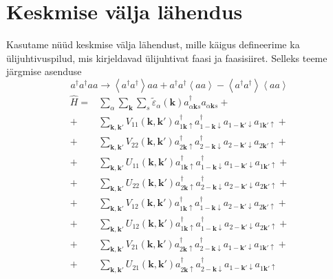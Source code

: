 \documentclass[class=article, crop=false]{standalone}
\begin{document}
\section{Keskmise välja lähendus}
Kasutame nüüd keskmise välja lähendust, mille käigus defineerime ka ülijuhtivuspilud, mis kirjeldavad ülijuhtivat faasi ja faasisiiret. Selleks teeme järgmise asenduse
\begin{equation}
a^{ \dagger}a^{ \dagger} a a \rightarrow \left\langle  a^{ \dagger} a^{ \dagger} \right\rangle a a + a^{ \dagger} a^{ \dagger} \left\langle a a \right\rangle - \left\langle a^{ \dagger} a^{ \dagger} \right\rangle \left\langle a a \right\rangle
\end{equation}
\begin{equation} \label{key}
	\begin{split}
		\hat{H} = & \sum_{ \alpha} \sum_{ \mathbf{k}} \sum_{s} \tilde{ \varepsilon}_{ \alpha} ( \mathbf{k}) a^{ \dagger}_{ \alpha \mathbf{k} s} a_{ \alpha \mathbf{k} s} + \\
		+ & \sum_{ \mathbf{k}, \mathbf{k}'} V_{ 1 1} ( \mathbf{k}, \mathbf{k}') a^{ \dagger}_{ 1 \mathbf{k} \uparrow} a^{ \dagger}_{ 1 -\mathbf{k} \downarrow} a_{ 1 -\mathbf{k}' \downarrow} a_{ 1 \mathbf{k}' \uparrow} + \\
		+ & \sum_{ \mathbf{k}, \mathbf{k}'} V_{ 2 2} ( \mathbf{k}, \mathbf{k}') a^{ \dagger}_{ 2 \mathbf{k} \uparrow} a^{ \dagger}_{ 2 -\mathbf{k} \downarrow} a_{ 2 -\mathbf{k}' \downarrow} a_{ 2 \mathbf{k}' \uparrow} + \\
		+ & \sum_{ \mathbf{k}, \mathbf{k}'} U_{ 1 1} ( \mathbf{k}, \mathbf{k}') a^{ \dagger}_{ 1 \mathbf{k} \uparrow} a^{ \dagger}_{ 1 -\mathbf{k} \downarrow} a_{ 1 -\mathbf{k}' \downarrow} a_{ 1 \mathbf{k}' \uparrow} + \\
		+ & \sum_{ \mathbf{k}, \mathbf{k}'} U_{ 2 2} ( \mathbf{k}, \mathbf{k}') a^{ \dagger}_{ 2 \mathbf{k} \uparrow} a^{ \dagger}_{ 2 -\mathbf{k} \downarrow} a_{ 2 -\mathbf{k}' \downarrow} a_{ 2 \mathbf{k}' \uparrow} + \\
		+ & \sum_{ \mathbf{k}, \mathbf{k}'} V_{ 1 2} ( \mathbf{k}, \mathbf{k}') a^{ \dagger}_{ 1 \mathbf{k} \uparrow} a^{ \dagger}_{ 1 -\mathbf{k} \downarrow} a_{ 2 -\mathbf{k}' \downarrow} a_{ 2 \mathbf{k}' \uparrow} + \\
		+ & \sum_{ \mathbf{k}, \mathbf{k}'} U_{ 1 2} ( \mathbf{k}, \mathbf{k}') a^{ \dagger}_{ 1 \mathbf{k} \uparrow} a^{ \dagger}_{ 1 -\mathbf{k} \downarrow} a_{ 2 -\mathbf{k}' \downarrow} a_{ 2 \mathbf{k}' \uparrow} + \\
		+ & \sum_{ \mathbf{k}, \mathbf{k}'} V_{ 2 1} ( \mathbf{k}, \mathbf{k}') a^{ \dagger}_{ 2 \mathbf{k} \uparrow} a^{ \dagger}_{ 2 -\mathbf{k} \downarrow} a_{ 1 -\mathbf{k}' \downarrow} a_{ 1 \mathbf{k}' \uparrow} + \\
		+ & \sum_{ \mathbf{k}, \mathbf{k}'} U_{ 2 1} ( \mathbf{k}, \mathbf{k}') a^{ \dagger}_{ 2 \mathbf{k} \uparrow} a^{ \dagger}_{ 2 -\mathbf{k} \downarrow} a_{ 1 -\mathbf{k}' \downarrow} a_{ 1 \mathbf{k}' \uparrow}
	\end{split}
\end{equation}
\end{document}
